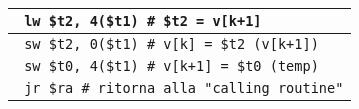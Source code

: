 \documentclass[../main.tex]{subfiles}
\begin{document}
\begin{tabular}{ l }
    \texttt{\hspace*{0cm} \hspace*{0cm} \hspace*{0cm} \hspace*{0cm} \hspace*{0cm} \hspace*{0cm} \hspace*{0cm} lw \$t2, 4(\$t1) \hspace*{0cm} \hspace*{0cm} \hspace*{0cm} \hspace*{0cm} \# \$t2 = v[k+1]} \\
    \hline
    \hline
    \texttt{\hspace*{0cm} \hspace*{0cm} \hspace*{0cm} \hspace*{0cm} \hspace*{0cm} \hspace*{0cm} \hspace*{0cm} sw \$t2, 0(\$t1) \hspace*{0cm} \hspace*{0cm} \hspace*{0cm} \hspace*{0cm} \# v[k] = \$t2 (v[k+1])} \\
    \texttt{\hspace*{0cm} \hspace*{0cm} \hspace*{0cm} \hspace*{0cm} \hspace*{0cm} \hspace*{0cm} \hspace*{0cm} sw \$t0, 4(\$t1) \hspace*{0cm} \hspace*{0cm} \hspace*{0cm} \hspace*{0cm} \# v[k+1] = \$t0 (temp)} \\
    \hline
    \hline
    \texttt{\hspace*{0cm} \hspace*{0cm} \hspace*{0cm} \hspace*{0cm} \hspace*{0cm} \hspace*{0cm} \hspace*{0cm} jr \$ra \hspace*{0cm} \hspace*{0cm} \hspace*{0cm} \hspace*{0cm} \hspace*{0cm} \hspace*{0cm} \hspace*{0cm} \hspace*{0cm} \hspace*{0cm} \hspace*{0cm} \hspace*{0cm} \hspace*{0cm} \# ritorna alla "calling routine"} \\
    \hline
    \hline
\end{tabular}
\end{document}
